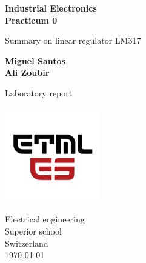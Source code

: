 \begin{titlepage}
   \begin{center}
        \vspace*{1cm}
        \LARGE
        \textbf{Industrial Electronics \\ Practicum 0}
        
        \vspace{0.3cm}
        Summary on linear regulator LM317
            
        \vspace{1.5cm}

        \textbf{Miguel Santos \\ Ali Zoubir}

        \vfill
            
        Laboratory report
            
        \vspace{0.8cm}
     
        \includegraphics[width=0.31\textwidth]{ETML-ES-LOGO.png}

        Electrical engineering\\
        Superior school\\
        Switzerland\\
        \monthyeardate\today
            
   \end{center}
\end{titlepage}
